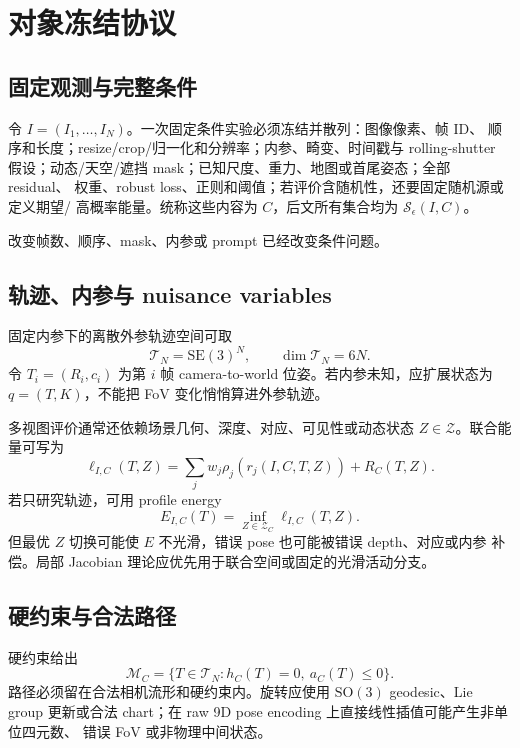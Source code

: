 \documentclass[UTF8,a4paper,11pt]{ctexart}
\newcommand{\SE}{\mathrm{SE}}
\newcommand{\SO}{\mathrm{SO}}
\newcommand{\Sset}{\mathcal S}
\newcommand{\Tspace}{\mathcal T}
\newcommand{\Mspace}{\mathcal M}
\begin{document}
\section{对象冻结协议}

\subsection{固定观测与完整条件}

令 $I=(I_1,\ldots,I_N)$。一次固定条件实验必须冻结并散列：图像像素、帧 ID、
顺序和长度；resize/crop/归一化和分辨率；内参、畸变、时间戳与 rolling-shutter
假设；动态/天空/遮挡 mask；已知尺度、重力、地图或首尾姿态；全部 residual、
权重、robust loss、正则和阈值；若评价含随机性，还要固定随机源或定义期望/
高概率能量。统称这些内容为 $C$，后文所有集合均为 $\Sset_\epsilon(I,C)$。

改变帧数、顺序、mask、内参或 prompt 已经改变条件问题。

\subsection{轨迹、内参与 nuisance variables}

固定内参下的离散外参轨迹空间可取
\begin{equation}
  \Tspace_N=\SE(3)^N,\qquad \dim\Tspace_N=6N.
\end{equation}
令 $T_i=(R_i,c_i)$ 为第 $i$ 帧 camera-to-world 位姿。若内参未知，应扩展状态为
$q=(T,K)$，不能把 FoV 变化悄悄算进外参轨迹。

多视图评价通常还依赖场景几何、深度、对应、可见性或动态状态
$Z\in\mathcal Z$。联合能量可写为
\begin{equation}
  \ell_{I,C}(T,Z)
  =\sum_j w_j\rho_j\!\left(r_j(I,C,T,Z)\right)+R_C(T,Z).
  \label{eq:joint-energy}
\end{equation}
若只研究轨迹，可用 profile energy
\begin{equation}
  E_{I,C}(T)=\inf_{Z\in\mathcal Z_C}\ell_{I,C}(T,Z).
  \label{eq:profile-energy}
\end{equation}
但最优 $Z$ 切换可能使 $E$ 不光滑，错误 pose 也可能被错误 depth、对应或内参
补偿。局部 Jacobian 理论应优先用于联合空间或固定的光滑活动分支。

\subsection{硬约束与合法路径}

硬约束给出
\begin{equation}
  \Mspace_C
  =\{T\in\Tspace_N:h_C(T)=0,\ a_C(T)\le0\}.
\end{equation}
路径必须留在合法相机流形和硬约束内。旋转应使用 $\SO(3)$ geodesic、Lie group
更新或合法 chart；在 raw 9D pose encoding 上直接线性插值可能产生非单位四元数、
错误 FoV 或非物理中间状态。
\end{document}

